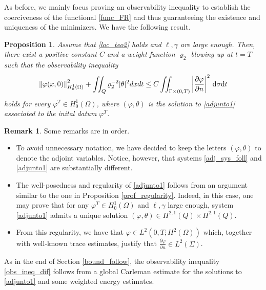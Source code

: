 \documentclass{dcds-bOF}
\newtheorem{proposition}{Proposition}
\theoremstyle{definition}
\newtheorem{remark}{Remark}
\def\cbd{\Gamma}
\def\dt{\textnormal{d}t}
\def\d{\,\textnormal{d}}
\begin{document}
As before, we mainly focus proving an observability inequality to establish the coerciveness of the functional \eqref{func_FR} and thus guaranteeing the existence and uniqueness of the minimizers. We have the following result.
%
\begin{proposition}\label{prop_obs_ineq_dif}
Assume that \eqref{loc_teo2} holds and $\ell,\gamma$ are large enough.  Then, there exist a positive constant $C$ and a weight function $\varrho_2$ blowing up at $t=T$ such that the observability inequality
%
\begin{equation}\label{obs_ineq_dif}
\left\|\varphi(x,0)\right\|^2_{H_0^1(\Omega)}+\iint_{Q}{\varrho}_2^{-2}|\theta|^2dxdt\leq C\iint_{\cbd \times(0,T)}\left|\frac{\partial \varphi}{\partial n} \right|^2\d\sigma\dt
\end{equation}
%
holds for every $\varphi^T\in H_0^{1}(\Omega)$, where $(\varphi,\theta)$ is the solution to \eqref{adjunto1} associated to the inital datum $\varphi^T$.
\end{proposition}
%

\begin{remark}
Some remarks are in order.
%
\begin{itemize}
\item To avoid unnecessary notation, we have decided to keep the letters $(\varphi,\theta)$ to denote the adjoint variables. Notice, however, that  systems \eqref{adj_sys_foll} and \eqref{adjunto1} are substantially different.
\item The well-posedness and regularity of \eqref{adjunto1} follows from an argument similar to the one in Proposition \ref{prof_regularity}. Indeed, in this case, one may prove that for any $\varphi^T\in H_0^1(\Omega)$ and $\ell,\gamma$ large enough, system \eqref{adjunto1} admits a unique solution $(\varphi,\theta)\in H^{2,1}(Q)\times H^{2,1}(Q)$.
\item From this regularity, we have that $\varphi\in L^2(0,T;H^2(\Omega))$ which, together with well-known trace estimates, justify that $\frac{\partial\varphi}{\partial n}\in L^2(\Sigma)$.
\end{itemize}
%
\end{remark}

As in the end of Section \ref{bound_follow}, the observability inequality \eqref{obs_ineq_dif} follows from a global Carleman estimate for the solutions to \eqref{adjunto1} and some weighted energy estimates.
\end{document}
